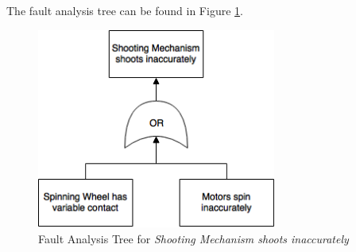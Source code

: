 \documentclass[11pt]{article}
\begin{document}
The fault analysis tree can be found in Figure \ref{fig:ft-shooting}.

\begin{figure}[H]
   \centering
   \includegraphics[width=0.7\textwidth]{img/ft-shooting.png} %
   \caption{Fault Analysis Tree for \textit{Shooting Mechanism shoots inaccurately}}
   \label{fig:ft-shooting}
\end{figure}
\end{document}
